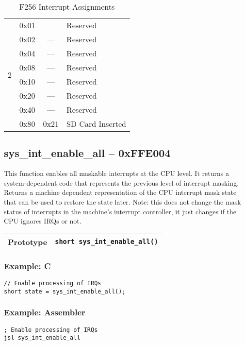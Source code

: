 \begin{table}
\begin{center}
\begin{tabular}{|c|c||c|l|}
            \multirow{8}{*}{2} & 0x01 & --- & Reserved \\ \cline{2-4}
                & 0x02 & --- & Reserved \\ \cline{2-4}
                & 0x04 & --- & Reserved \\ \cline{2-4}
                & 0x08 & --- & Reserved \\ \cline{2-4}
                & 0x10 & --- & Reserved \\ \cline{2-4}
                & 0x20 & --- & Reserved \\ \cline{2-4}
                & 0x40 & --- & Reserved \\ \cline{2-4}
                & 0x80 & 0x21 & SD Card Inserted \\ \hline
        \end{tabular}
    \end{center}
    \caption{F256 Interrupt Assignments}
\end{table}

\subsection*{sys\_int\_enable\_all -- 0xFFE004}
This function enables all maskable interrupts at the CPU level. It returns a system-dependent code that represents the previous level of interrupt masking.
Returns a machine dependent representation of the CPU interrupt mask state that can be used to restore the state later.
Note: this does not change the mask status of interrupts in the machine's interrupt controller, it just changes if the CPU ignores IRQs or not.

\bigskip

\begin{tabular}{|l||l|} \hline
Prototype & \lstinline!short sys_int_enable_all()! \\ \hline
\end{tabular}

\subsubsection*{Example: C}
\begin{lstlisting}
// Enable processing of IRQs
short state = sys_int_enable_all();
\end{lstlisting}

\subsubsection*{Example: Assembler}
\begin{verbatim}
; Enable processing of IRQs
jsl sys_int_enable_all
\end{verbatim}

